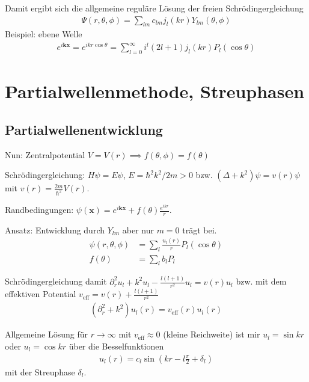 \documentclass[11pt,a4paper]{report}
\begin{document}
Damit ergibt sich die allgemeine reguläre Lösung der freien Schrödingergleichung
\begin{align*}
    \Psi(r, \theta, \phi) = \sum_{l m} c_{l m} j_l (k r) Y_{l m}(\theta, \phi)
\end{align*}
Beispiel: ebene Welle
\begin{align*}
    e^{i \mathbf{k} \mathbf{x}} = e^{i k r \cos \theta} = \sum_{l = 0}^\infty i^l (2l +1) j_l(k r) P_l (\cos \theta)
\end{align*}

\section{Partialwellenmethode, Streuphasen}

\subsection{Partialwellenentwicklung}

Nun: Zentralpotential $V = V(r) \implies f(\theta, \phi) = f(\theta)$

Schrödingergleichung: $H \psi = E \psi$, $E = \hbar^2 k^2 / 2 m > 0$ bzw. $(\Delta + k^2) \psi = v(r) \psi$ mit $v(r) = \frac{2m}{\hbar^2} V(r)$.

Randbedingungen: $\psi(\mathbf{x}) = e^{i \mathbf{k} \mathbf{x}} + f(\theta) \frac{e^{i k r}}{r}$.

Ansatz: Entwicklung durch $Y_{l m}$ aber nur $m=0$ trägt bei.
\begin{align*}
    \psi(r, \theta, \phi) &= \sum_l \frac{u_l(r)}{r} P_l(\cos \theta) \\
    f(\theta) &= \sum_l b_l P_l
\end{align*}

Schrödingergleichung damit $\partial_r^2 u_l + k^2 u_l - \frac{l (l+1)}{r^2} u_l = v(r) u_l$ bzw. mit dem effektiven Potential $v_{\mathrm{eff}} = v(r) + \frac{l (l+1)}{r^2}$ 
\begin{align*}
    (\partial_r^2 + k^2) u_l (r) = v_{\mathrm{eff}}(r) u_l(r)
\end{align*}

Allgemeine Lösung für $r \rightarrow \infty$ mit $v_{\mathrm{eff}} \approx 0$ (kleine Reichweite) ist mir $u_l = \sin kr$ oder $u_l = \cos k r$ über die Besselfunktionen
\begin{align*}
    u_l(r) = c_l \sin \left(k r - l \frac{\pi}{2} + \delta_l \right)
\end{align*}
mit der Streuphase $\delta_l$.
\end{document}
